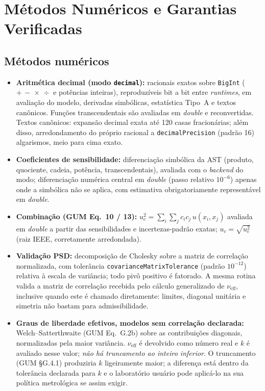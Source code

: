 \documentclass[11pt,a4paper]{article}
\begin{document}
\section{Métodos Numéricos e Garantias Verificadas}
\label{sec:metodos}

\subsection{Métodos numéricos}

\begin{itemize}
  \item \textbf{Aritmética decimal (modo \texttt{decimal}):} racionais exatos sobre \texttt{BigInt} (\(+\,-\,\times\,\div\) e potências inteiras), reproduzíveis bit a bit entre \emph{runtimes}, em avaliação do modelo, derivadas simbólicas, estatística Tipo~A e textos canônicos. Funções transcendentais são avaliadas em \emph{double} e reconvertidas. Textos canônicos: expansão decimal exata até 120 casas fracionárias; além disso, arredondamento do próprio racional a \texttt{decimalPrecision} (padrão 16) algarismos, meio para cima exato.
  \item \textbf{Coeficientes de sensibilidade:} diferenciação simbólica da AST (produto, quociente, cadeia, potência, transcendentais), avaliada com o \emph{backend} do modo; diferenciação numérica central em \emph{double} (passo relativo \(10^{-6}\)) apenas onde a simbólica não se aplica, com estimativa obrigatoriamente representável em \emph{double}.
  \item \textbf{Combinação (GUM Eq.~10 / 13):} \(u_c^2 = \sum_i \sum_j c_i c_j\, u(x_i, x_j)\) avaliada em \emph{double} a partir das sensibilidades e incertezas-padrão exatas; \(u_c = \sqrt{u_c^2}\) (raiz IEEE, corretamente arredondada).
  \item \textbf{Validação PSD:} decomposição de Cholesky sobre a matriz de correlação normalizada, com tolerância \texttt{covarianceMatrixTolerance} (padrão \(10^{-12}\)) relativa à escala de variância; todo pivô positivo é fatorado. A mesma rotina valida a matriz de correlação recebida pelo cálculo generalizado de \(\nu_{\text{eff}}\), inclusive quando este é chamado diretamente: limites, diagonal unitária e simetria não bastam para admissibilidade.
  \item \textbf{Graus de liberdade efetivos, modelos sem correlação declarada:} Welch--Satterthwaite (GUM Eq.~G.2b) sobre as contribuições diagonais, normalizadas pela maior variância. \(\nu_{\text{eff}}\) é devolvido como número real e \(k\) é avaliado nesse valor; \emph{não há truncamento ao inteiro inferior}. O truncamento (GUM §G.4.1) produziria \(k\) ligeiramente maior; a diferença está dentro da tolerância declarada para \(k\) e o laboratório usuário pode aplicá-lo na sua política metrológica se assim exigir.

\end{itemize}
\end{document}
